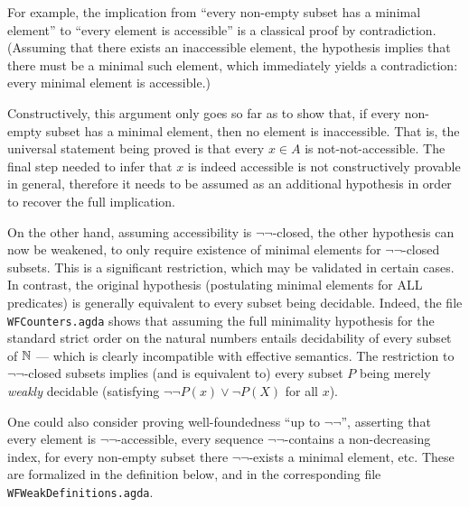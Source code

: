 For example, the implication from ``every non-empty subset has a minimal element'' to
``every element is accessible''  is a classical proof by contradiction.
(Assuming that there exists an inaccessible element, the hypothesis implies that
there must be a minimal such element, which immediately yields a contradiction:
every minimal element is accessible.)

Constructively, this argument only goes so far as to show that, if every non-empty
subset has a minimal element, then no element is inaccessible.
That is, the universal statement being proved is that every $x \in A$
is not-not-accessible. The final step needed to infer that $x$ is indeed accessible
is not constructively provable in general, therefore it needs to be assumed as
an additional hypothesis in order to recover the full implication.

On the other hand, assuming accessibility is $\lnot\lnot$-closed, the other
hypothesis can now be weakened, to only require existence of minimal elements
for $\lnot\lnot$-closed subsets.  This is a significant restriction, which may
be validated in certain cases.  In contrast, the original hypothesis
(postulating minimal elements for ALL predicates)
is generally equivalent to every subset being decidable.
Indeed, the file \texttt{WFCounters.agda} shows that assuming the full minimality hypothesis
for the standard strict order on the natural numbers entails decidability
of every subset of $\mathbb{N}$ --- which is clearly incompatible with effective semantics.
The restriction to $\lnot\lnot$-closed subsets implies (and is equivalent to) 
every subset $P$ being merely \emph{weakly} decidable (satisfying $\lnot \lnot P(x) \lor \lnot P(X)$ 
for all $x$).

One could also consider proving well-foundedness ``up to $\lnot\lnot$'',
asserting that every element is $\lnot\lnot$-accessible,
every sequence $\lnot\lnot$-contains a non-decreasing index,
for every non-empty subset there $\lnot\lnot$-exists a minimal element, etc.
These are formalized in the definition below, and in the corresponding file
\texttt{WFWeakDefinitions.agda}.

